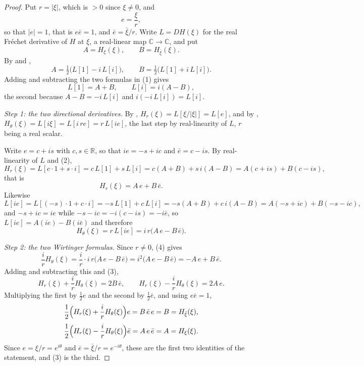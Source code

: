 \begin{proof}
Put $r=|\xi|$, which is $>0$ since $\xi\neq0$, and
\[
  e=\frac{\xi}{r},
\]
so that $|e|=1$, that is $e\bar e=1$, and $\bar e=\bar\xi/r$.  Write
$L=DH(\xi)$ for the real Fr\'echet derivative of $H$ at $\xi$, a real-linear
map $\mathbb{C}\to\mathbb{C}$, and put
\[
  A=H_\xi(\xi),\qquad B=H_{\bar\xi}(\xi).
\]
By  and ,
\begin{equation}\tag{1}
  A=\tfrac12\bigl(L[1]-i\,L[i]\bigr),\qquad B=\tfrac12\bigl(L[1]+i\,L[i]\bigr).
\end{equation}
Adding and subtracting the two formulas in (1) gives
\begin{equation}\tag{2}
  L[1]=A+B,\qquad L[i]=i(A-B),
\end{equation}
the second because $A-B=-i\,L[i]$ and $i(-i\,L[i])=L[i]$.

\emph{Step 1: the two directional derivatives.}  By ,
$H_r(\xi)=L[\xi/|\xi|]=L[e]$, and by ,
$H_\theta(\xi)=L[i\xi]=L[i\,re]=r\,L[ie]$, the last step by real-linearity of
$L$, $r$ being a real scalar.

Write $e=c+is$ with $c,s\in\mathbb{R}$, so that $ie=-s+ic$ and
$\bar e=c-is$.  By real-linearity of $L$ and (2),
\[
  H_r(\xi)=L[c\cdot1+s\cdot i]=c\,L[1]+s\,L[i]=c(A+B)+s\,i(A-B)
  =A(c+is)+B(c-is),
\]
that is
\begin{equation}\tag{3}
  H_r(\xi)=A\,e+B\,\bar e .
\end{equation}
Likewise
\[
  L[ie]=L[(-s)\cdot1+c\cdot i]=-s\,L[1]+c\,L[i]=-s(A+B)+c\,i(A-B)
  =A(-s+ic)+B(-s-ic),
\]
and $-s+ic=ie$ while $-s-ic=-i(c-is)=-i\bar e$, so $L[ie]=A(ie)-B(i\bar e)$ and
therefore
\begin{equation}\tag{4}
  H_\theta(\xi)=r\,L[ie]=i\,r\bigl(A\,e-B\,\bar e\bigr).
\end{equation}

\emph{Step 2: the two Wirtinger formulas.}  Since $r\neq0$, (4) gives
\[
  \frac ir H_\theta(\xi)=\frac ir\cdot i\,r\bigl(A\,e-B\,\bar e\bigr)
  =i^2\bigl(A\,e-B\,\bar e\bigr)=-A\,e+B\,\bar e .
\]
Adding and subtracting this and (3),
\[
  H_r(\xi)+\frac ir H_\theta(\xi)=2B\,\bar e,
  \qquad
  H_r(\xi)-\frac ir H_\theta(\xi)=2A\,e .
\]
Multiplying the first by $\tfrac12 e$ and the second by $\tfrac12\bar e$, and
using $e\bar e=1$,
\[
  \frac12\Bigl(H_r(\xi)+\frac ir H_\theta(\xi)\Bigr)e=B\,\bar e\,e=B=H_{\bar\xi}(\xi),
\]
\[
  \frac12\Bigl(H_r(\xi)-\frac ir H_\theta(\xi)\Bigr)\bar e=A\,e\,\bar e=A=H_\xi(\xi).
\]
Since $e=\xi/r=e^{i\theta}$ and $\bar e=\bar\xi/r=e^{-i\theta}$, these are the
first two identities of the statement, and (3) is the third.
\end{proof}
